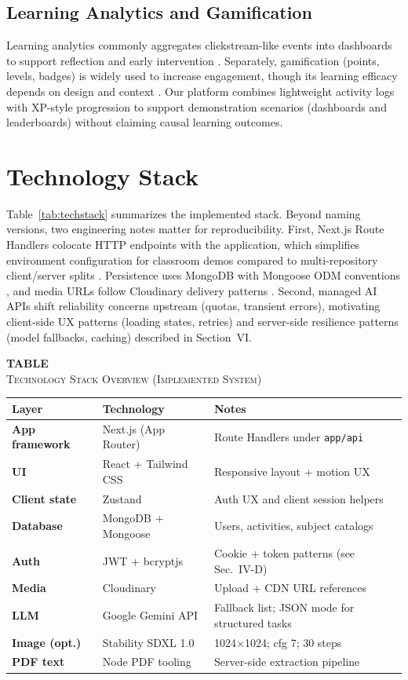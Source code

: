 \documentclass[conference]{IEEEtran}
\newcommand{\tabcap}[2]{%
  \par\addvspace{2pt}%
  \refstepcounter{table}\label{#1}%
  {\centering\footnotesize\textbf{TABLE~\Roman{table}}\\%
  \textsc{#2}\par}%
  \addvspace{2pt}%
}
\begin{document}
\subsection{Learning Analytics and Gamification}

Learning analytics commonly aggregates clickstream-like events into dashboards to support reflection and early intervention \cite{b12}. Separately, gamification (points, levels, badges) is widely used to increase engagement, though its learning efficacy depends on design and context \cite{b13}. Our platform combines lightweight activity logs with XP-style progression to support demonstration scenarios (dashboards and leaderboards) without claiming causal learning outcomes.

\section{Technology Stack}

Table~\ref{tab:techstack} summarizes the implemented stack. Beyond naming versions, two engineering notes matter for reproducibility. First, Next.js Route Handlers colocate HTTP endpoints with the application, which simplifies environment configuration for classroom demos compared to multi-repository client/server splits \cite{b4}. Persistence uses MongoDB with Mongoose ODM conventions \cite{b5}, and media URLs follow Cloudinary delivery patterns \cite{b8}. Second, managed AI APIs shift reliability concerns upstream (quotas, transient errors), motivating client-side UX patterns (loading states, retries) and server-side resilience patterns (model fallbacks, caching) described in Section~VI.

\begin{center}
\tabcap{tab:techstack}{Technology Stack Overview (Implemented System)}
\renewcommand{\arraystretch}{1.15}
\footnotesize
\begin{tabular}{|>{\bfseries}p{1.7cm}|p{2.4cm}|p{3.4cm}|}
\hline
\textbf{Layer} & \textbf{Technology} & \textbf{Notes} \\
\hline
App framework & Next.js (App Router) & Route Handlers under \texttt{app/api} \\
\hline
UI & React + Tailwind CSS & Responsive layout + motion UX \\
\hline
Client state & Zustand & Auth UX and client session helpers \\
\hline
Database & MongoDB + Mongoose & Users, activities, subject catalogs \\
\hline
Auth & JWT + bcryptjs & Cookie + token patterns (see Sec.~IV-D) \\
\hline
Media & Cloudinary & Upload + CDN URL references \\
\hline
LLM & Google Gemini API & Fallback list; JSON mode for structured tasks \\
\hline
Image (opt.) & Stability SDXL 1.0 & 1024$\times$1024; cfg 7; 30 steps \cite{b7} \\
\hline
PDF text & Node PDF tooling & Server-side extraction pipeline \\
\hline
\end{tabular}
\end{center}
\end{document}
